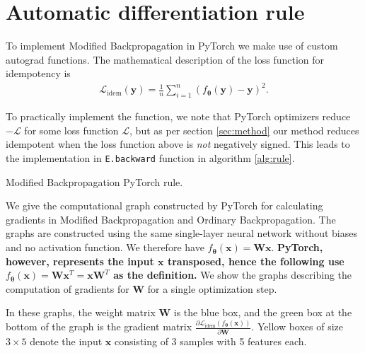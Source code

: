 \documentclass{article}
\theoremstyle{plain}
\theoremstyle{definition}
\theoremstyle{remark}
\newcommand{\vx}{\mathbf{x}}
\newcommand{\vy}{\mathbf{y}}
\newcommand{\vW}{\mathbf{W}}
\newcommand{\vtheta}{\bm{\theta}}
\newcommand{\pd}[2]{\frac{\partial{#1}}{\partial{#2}}}
\begin{document}
\newpage
\section{Automatic differentiation rule}
\label{app:autodiff-rule}
To implement Modified Backpropagation in PyTorch we make use of custom autograd functions. The mathematical description of the loss function for idempotency is
%
\begin{align*}
    \mathcal{L}_{\mathrm{idem}}(\vy) = \frac{1}{n} \sum_{i = 1}^n \left( f_{\vtheta}(\vy) - \vy \right)^2.
\end{align*}

To practically implement the function, we note that PyTorch optimizers reduce $-\mathcal{L}$ for some loss function $\mathcal{L}$, but as per section \ref{sec:method} our method reduces idempotent when the loss function above is \textit{not} negatively signed. This leads to the implementation in \texttt{E.backward} function in algorithm \ref{alg:rule}.

\begin{algorithm}[htbp]
    \caption{Modified Backpropagation PyTorch rule.}
    \label{alg:rule}
    
\end{algorithm}

\clearpage

We give the computational graph constructed by PyTorch for calculating gradients in Modified Backpropagation and Ordinary Backpropagation. The graphs are constructed using the same single-layer neural network without biases and no activation function. We therefore have $f_{\vtheta}(\vx)=\vW\vx$. \textbf{PyTorch, however, represents the input $\vx$ transposed, hence the following use  $f_{\vtheta}(\vx)=\vW\vx^T=\vx\vW^T$ as the definition.} We show the graphs describing the computation of gradients for $\vW$ for a single optimization step.

In these graphs, the weight matrix $\vW$ is the blue box, and the green box at the bottom of the graph is the gradient matrix $\pd{\mathcal{L}_{\mathrm{idem}}(f_{\vtheta}(\vx))}{\vW}$. Yellow boxes of size $3 \times 5$ denote the input $\vx$ consisting of 3 samples with 5 features each.
\end{document}
